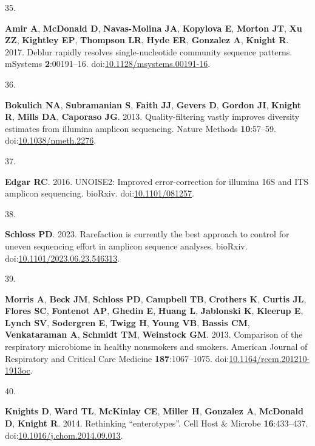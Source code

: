 \documentclass[
]{article}
\newlength{\cslhangindent}
\newlength{\csllabelwidth}
\newlength{\cslentryspacingunit} %
\newenvironment{CSLReferences}[2] %
 {%
  \setlength{\parindent}{0pt}
  \ifodd #1
  \let\oldpar\par
  \def\par{\hangindent=\cslhangindent\oldpar}
  \fi
  \setlength{\parskip}{#2\cslentryspacingunit}
 }%
 {}
\newcommand{\CSLLeftMargin}[1]{\parbox[t]{\csllabelwidth}{#1}}
\newcommand{\CSLRightInline}[1]{\parbox[t]{\linewidth - \csllabelwidth}{#1}\break}
\begin{document}
\begin{CSLReferences}{0}{1}
\leavevmode{}%
\CSLLeftMargin{35. }%
\CSLRightInline{\textbf{Amir A}, \textbf{McDonald D},
\textbf{Navas-Molina JA}, \textbf{Kopylova E}, \textbf{Morton JT},
\textbf{Xu ZZ}, \textbf{Kightley EP}, \textbf{Thompson LR}, \textbf{Hyde
ER}, \textbf{Gonzalez A}, \textbf{Knight R}. 2017. Deblur rapidly
resolves single-nucleotide community sequence patterns. {mSystems}
\textbf{2}:00191--16.
doi:\href{https://doi.org/10.1128/msystems.00191-16}{10.1128/msystems.00191-16}.}

\leavevmode{}%
\CSLLeftMargin{36. }%
\CSLRightInline{\textbf{Bokulich NA}, \textbf{Subramanian S},
\textbf{Faith JJ}, \textbf{Gevers D}, \textbf{Gordon JI}, \textbf{Knight
R}, \textbf{Mills DA}, \textbf{Caporaso JG}. 2013. Quality-filtering
vastly improves diversity estimates from illumina amplicon sequencing.
Nature Methods \textbf{10}:57--59.
doi:\href{https://doi.org/10.1038/nmeth.2276}{10.1038/nmeth.2276}.}

\leavevmode{}%
\CSLLeftMargin{37. }%
\CSLRightInline{\textbf{Edgar RC}. 2016. {UNOISE}2: Improved
error-correction for illumina 16S and {ITS} amplicon sequencing.
bio{R}xiv. doi:\href{https://doi.org/10.1101/081257}{10.1101/081257}.}

\leavevmode{}%
\CSLLeftMargin{38. }%
\CSLRightInline{\textbf{Schloss PD}. 2023. Rarefaction is currently the
best approach to control for uneven sequencing effort in amplicon
sequence analyses. bio{R}xiv.
doi:\href{https://doi.org/10.1101/2023.06.23.546313}{10.1101/2023.06.23.546313}.}

\leavevmode{}%
\CSLLeftMargin{39. }%
\CSLRightInline{\textbf{Morris A}, \textbf{Beck JM}, \textbf{Schloss
PD}, \textbf{Campbell TB}, \textbf{Crothers K}, \textbf{Curtis JL},
\textbf{Flores SC}, \textbf{Fontenot AP}, \textbf{Ghedin E},
\textbf{Huang L}, \textbf{Jablonski K}, \textbf{Kleerup E},
\textbf{Lynch SV}, \textbf{Sodergren E}, \textbf{Twigg H}, \textbf{Young
VB}, \textbf{Bassis CM}, \textbf{Venkataraman A}, \textbf{Schmidt TM},
\textbf{Weinstock GM}. 2013. Comparison of the respiratory microbiome in
healthy nonsmokers and smokers. American Journal of Respiratory and
Critical Care Medicine \textbf{187}:1067--1075.
doi:\href{https://doi.org/10.1164/rccm.201210-1913oc}{10.1164/rccm.201210-1913oc}.}

\leavevmode{}%
\CSLLeftMargin{40. }%
\CSLRightInline{\textbf{Knights D}, \textbf{Ward TL}, \textbf{McKinlay
CE}, \textbf{Miller H}, \textbf{Gonzalez A}, \textbf{McDonald D},
\textbf{Knight R}. 2014. Rethinking {``}enterotypes{''}. Cell Host {\&}
Microbe \textbf{16}:433--437.
doi:\href{https://doi.org/10.1016/j.chom.2014.09.013}{10.1016/j.chom.2014.09.013}.}


\end{CSLReferences}
\end{document}
